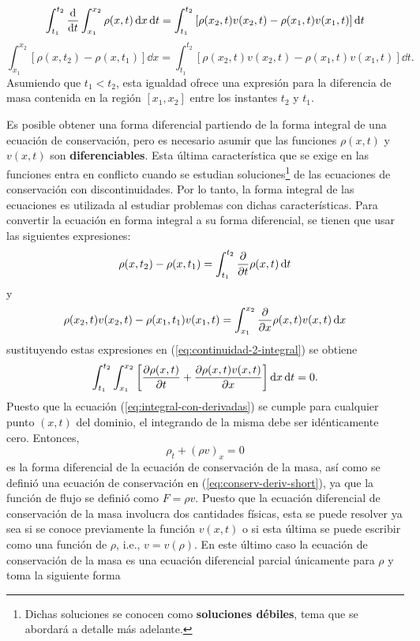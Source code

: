 \begin{equation}
	\int_{t_1}^{t_2}\dv{t}\int_{x_1}^{x_2}\rho(x,t)\dd{x}\dd{t}  = \int_{t_1}^{t_2}\left[\rho(x_2,t)v(x_2,t) - \rho(x_1,t)v(x_1,t)\right]\dd{t}
\end{equation}
\begin{equation}
	\int_{x_1}^{x_2}[\rho(x,t_2) - \rho(x,t_1)]\dd{x}  = \int_{t_1}^{t_2}\left[\rho(x_2,t)v(x_2,t) - \rho(x_1,t)v(x_1,t)\right]\dd{t} 
	\label{eq:continuidad-2-integral}.
\end{equation}
Asumiendo que $t_1<t_2$, esta igualdad ofrece una expresión para la diferencia de masa contenida en la región $[x_1,x_2]$ entre los instantes $t_2$ y $t_1$. 

Es posible obtener una forma diferencial partiendo de la forma integral de una ecuación de conservación, pero es necesario asumir que las funciones $\rho(x,t)$ y $v(x,t)$ son \textbf{diferenciables}. Esta última característica que se exige en las funciones entra en conflicto cuando se estudian soluciones\footnote{Dichas soluciones se conocen como \textbf{soluciones débiles}, tema que se abordará a detalle más adelante.} de las ecuaciones de conservación con discontinuidades. Por lo tanto, la forma integral de las ecuaciones es utilizada al estudiar problemas con dichas características. Para convertir la ecuación en forma integral a su forma diferencial, se tienen que usar las siguientes expresiones:
\begin{equation}
	\rho(x,t_2)-\rho(x,t_1) = \int_{t_1}^{t_2}\pdv{t}\rho(x,t)\dd{t}
\end{equation}
y
\begin{equation}
	\rho(x_2,t)v(x_2,t)-\rho(x_1,t_1)v(x_1,t) = \int_{x_1}^{x_2}\pdv{x}\rho(x,t)v(x,t)\dd{x}
\end{equation}
sustituyendo estas expresiones en (\ref{eq:continuidad-2-integral}) se obtiene
\begin{equation}
	\int_{t_1}^{t_2}\int_{x_1}^{x_2}\left[\pdv{\rho(x,t)}{t} + \pdv{\rho(x,t)v(x,t)}{x}\right]\dd{x}\dd{t} = 0.
	\label{eq:integral-con-derivadas}
\end{equation}
Puesto que la ecuación (\ref{eq:integral-con-derivadas}) se cumple para cualquier punto $(x,t)$ del dominio, el integrando de la misma debe ser idénticamente cero. Entonces,
\begin{equation}
	\rho_{t} + (\rho v)_{x} = 0
\end{equation}
es la forma diferencial de la ecuación de conservación de la masa, así como se definió una ecuación de conservación en (\ref{eq:conserv-deriv-short}), ya que la función de flujo se definió como $F = \rho v$. Puesto que la ecuación diferencial de conservación de la masa involucra dos cantidades físicas, esta se puede resolver ya sea si se conoce previamente la función $v(x,t)$ o si esta última se puede escribir como una función de $\rho$, i.e., $v=v(\rho)$. En este último caso la ecuación de conservación de la masa es una ecuación diferencial parcial únicamente para $\rho$ y toma la siguiente forma
